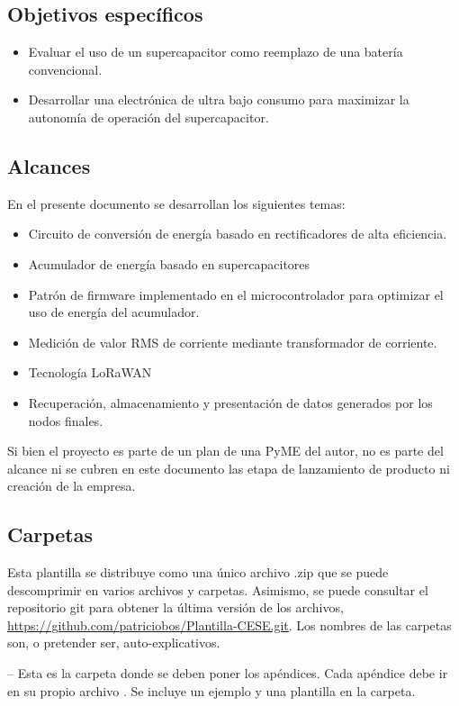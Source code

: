 \subsection{Objetivos específicos}
\begin{itemize}
	\item Evaluar el uso de un supercapacitor como reemplazo de una batería convencional.\\
	\item Desarrollar una electrónica de ultra bajo consumo para maximizar la autonomía de operación del supercapacitor.
\end{itemize}
\subsection{Alcances}
En el presente documento se desarrollan los siguientes temas:
\begin{itemize}
	\item Circuito de conversión de energía  basado en rectificadores de alta eficiencia.
	\item Acumulador de energía basado en supercapacitores
	\item Patrón de firmware implementado en el microcontrolador para optimizar el uso de energía del acumulador.
	\item Medición de valor RMS de corriente mediante transformador de corriente.
	\item Tecnología LoRaWAN
	\item Recuperación, almacenamiento y presentación de datos generados por los nodos finales.
\end{itemize}
Si bien el proyecto es parte de un plan de una PyME del autor, no  es parte del alcance ni se cubren en este documento las etapa de lanzamiento de producto ni creación de la empresa.
\subsection{Carpetas}

Esta plantilla se distribuye como una único archivo .zip que se puede descomprimir en varios archivos y carpetas. Asimismo, se puede consultar el repositorio git para obtener la última versión de los archivos, \url{https://github.com/patriciobos/Plantilla-CESE.git}. Los nombres de las carpetas son, o pretender ser, auto-explicativos.

 -- Esta es la carpeta donde se deben poner los apéndices. Cada apéndice debe ir en su propio archivo . Se incluye un ejemplo y una plantilla en la carpeta.

